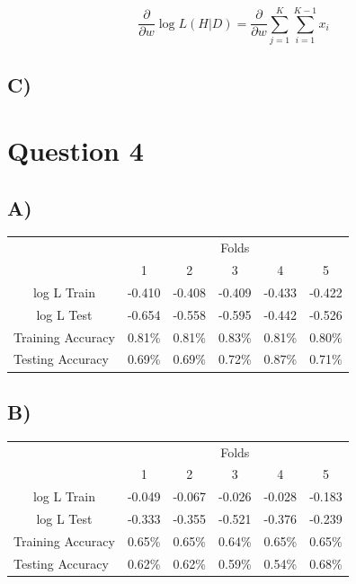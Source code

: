 \documentclass{report}
\begin{document}
\begin{equation}
  \frac{\partial}{\partial w} \log L(H | D) =
  \frac{\partial}{\partial w}
  \sum_{j=1}^K \sum_{i=1}^{K-1} x_i
\end{equation}


\subsection*{C)}

\newpage
\section*{Question 4}
\subsection*{A)}
\begin{center}
\begin{table}[h]
 \begin{tabular}{l|c|c|c|c|c|}
 \cline{2-6}
     & \multicolumn{5}{c|}{Folds}      \\ \cline{2-6}
     &  1  &  2  &  3  &  4  &  5 \\ \hline
\multicolumn{1}{|c|}{log L Train} & -0.410 & -0.408 & -0.409 & -0.433 & -0.422  \\ \hline
\multicolumn{1}{|c|}{log L Test} & -0.654 & -0.558 & -0.595 & -0.442 & -0.526  \\ \hline
\multicolumn{1}{|l|}{Training Accuracy} & 0.81\% & 0.81\% & 0.83\% & 0.81\% & 0.80\% \\ \hline
\multicolumn{1}{|l|}{Testing Accuracy} & 0.69\% & 0.69\% & 0.72\% & 0.87\% & 0.71\% \\ \hline
\end{tabular}
\end{table}
\end{center}


\subsection*{B)}
\begin{table}[h]
 \begin{tabular}{l|c|c|c|c|c|}
 \cline{2-6}
     & \multicolumn{5}{c|}{Folds}      \\ \cline{2-6}
     &  1  &  2  &  3  &  4  &  5 \\ \hline
\multicolumn{1}{|c|}{log L Train} & -0.049 & -0.067 & -0.026 & -0.028 & -0.183  \\ \hline
\multicolumn{1}{|c|}{log L Test} & -0.333 & -0.355 & -0.521 & -0.376 & -0.239  \\ \hline
\multicolumn{1}{|l|}{Training Accuracy} & 0.65\% & 0.65\% & 0.64\% & 0.65\% & 0.65\% \\ \hline
\multicolumn{1}{|l|}{Testing Accuracy} & 0.62\% & 0.62\% & 0.59\% & 0.54\% & 0.68\% \\ \hline
\end{tabular}
\end{table}
\end{document}
